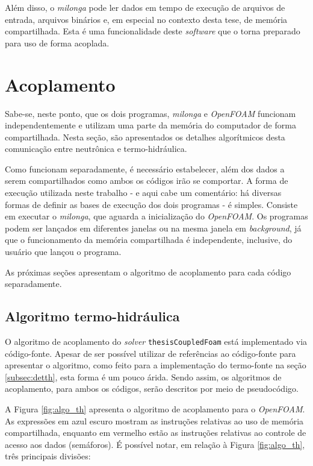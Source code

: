 Além disso, o \textit{milonga} pode ler dados em tempo de execução de arquivos de
entrada, arquivos binários e, em especial no contexto desta tese, de memória compartilhada.
Esta é uma funcionalidade deste \textit{software} que o torna preparado para uso de
forma acoplada.


\section{Acoplamento}
\label{sec:acoplamento}

Sabe-se, neste ponto, que os dois programas, \textit{milonga} e \textit{OpenFOAM} funcionam
independentemente e utilizam uma parte da memória do computador de forma compartilhada.
Nesta seção, são apresentados os detalhes algorítmicos desta comunicação entre neutrônica e
termo-hidráulica.

Como funcionam separadamente, é necessário estabelecer, além dos dados a serem compartilhados
como ambos os códigos irão se comportar. A forma de execução utilizada neste trabalho - e aqui cabe um comentário: há diversas
formas de definir as bases de execução dos dois programas - é simples.
Consiste em executar o \textit{milonga}, que aguarda
a inicialização do \textit{OpenFOAM}. Os programas podem ser lançados em diferentes janelas ou
na mesma janela em \textit{background}, já que o funcionamento da memória compartilhada é independente,
inclusive, do usuário que lançou o programa.

As próximas seções apresentam o algoritmo de acoplamento para cada código separadamente.


\subsection{Algoritmo termo-hidráulica}
\label{subsec:th}

O algoritmo de acoplamento do \textit{solver} \texttt{thesisCoupledFoam} está implementado
via código-fonte. Apesar de ser possível utilizar de referências ao código-fonte para
apresentar o algoritmo, como feito para a implementação do termo-fonte na seção \ref{subsec:detth},
esta forma é um pouco árida. Sendo assim, os algoritmos de acoplamento, para ambos os códigos,
serão descritos por meio de pseudocódigo.

A Figura \ref{fig:algo_th} apresenta o algoritmo de acoplamento para o \textit{OpenFOAM}.
As expressões em azul escuro mostram as instruções relativas ao uso de memória compartilhada,
enquanto em vermelho estão as instruções relativas ao controle de acesso aos dados (semáforos).
É possível notar, em relação à Figura \ref{fig:algo_th}, três principais divisões:

